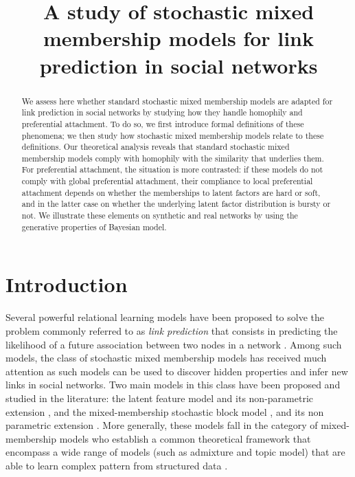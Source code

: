 \documentclass[journal]{IEEEtran}
\title{A study of stochastic mixed membership models for link prediction in social networks}
\begin{document}
\maketitle

\begin{abstract}
We assess here whether standard stochastic mixed membership models are adapted for link prediction in social networks by studying how they handle homophily and preferential attachment. To do so, we first introduce formal definitions of these phenomena; we then study how stochastic mixed membership models relate to these definitions. Our theoretical analysis reveals that standard stochastic mixed membership models comply with homophily with the similarity that underlies them. For preferential attachment, the situation is more contrasted: if these models do not comply with global preferential attachment, their compliance to local preferential attachment depends on whether the memberships to latent factors are hard or soft, and in the latter case on whether the underlying latent factor distribution is bursty or not. We illustrate these elements on synthetic and real networks by using the generative properties of Bayesian model.
\end{abstract}

\IEEEpeerreviewmaketitle

\section{Introduction}
\label{sec:intro}

Several powerful relational learning models have been proposed to solve the problem commonly referred to as \textit{link prediction} that consists in predicting the likelihood of a future association between two nodes in a network \cite{LibenNowell07,HassanZaki11}. Among such models, the class of stochastic mixed membership models has received much attention as such models can be used to discover hidden properties and infer new links in social networks. Two main models in this class have been proposed and studied in the literature: the latent feature model \cite{BMF} and its non-parametric extension \cite{ILFRM}, and the mixed-membership stochastic block model \cite{MMSB}, and its non parametric extension \cite{iMMSB,fan2015dynamic}. More generally, these models fall in the category of mixed-membership models who establish a common theoretical framework that encompass a wide range of models (such as admixture and topic model) that are able to  learn complex pattern from structured data \cite{airoldi2014handbook}.~\\
\end{document}

